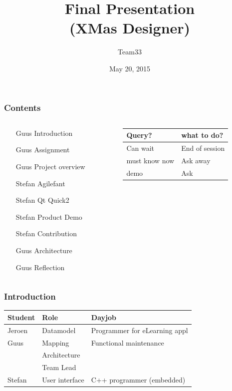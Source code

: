 \documentclass[11pt]{beamer}
\author{Team33}
\title{Final Presentation\\(XMas Designer)}
\institute{Open University/\\Guus Bonnema, Stefan Versluys, Jeroen Kleijn}
\date{May 20, 2015}
\begin{document}
\newcommand{\Noc}{\textsc{NoC}\xspace}
\newcommand{\qt}{\textsc{Qt}\xspace}
\newcommand{\qml}{\textsc{Qml}\xspace}
\newcommand{\ou}{\textsc{Ou}\xspace}
\newcommand{\dad}{\textsc{Dad}\xspace}

\begin{frame}
	\titlepage
\end{frame}

\begin{frame}
	\frametitle{Contents}
	\begin{columns}
		\begin{column}[t]{5cm}
			\begin{itemize}
				\item [Guus] Introduction 
				\item [Guus] Assignment
				\item [Guus] Project overview
				\item [Stefan] Agilefant
				\item [Stefan] Qt Quick2
				\item [Stefan] Product Demo
				\item [Stefan] Contribution
				\item [Guus] Architecture
				\item [Guus] Reflection
			\end{itemize}	
		\end{column}
		\begin{column}[t]{5cm}
			
			\begin{tabular}{ll}
				\hline
				{\tiny Query?} &  {\tiny what to do?} \\
				\hline
				{\tiny Can wait} & {\tiny End of session}\\
				{\tiny must know now} & {\tiny Ask away} \\
			 	{\tiny demo} & {\tiny Ask}\\
			 	\hline
			\end{tabular}
		\end{column}
	\end{columns}
	
\end{frame}

\begin{frame}
	\frametitle{Introduction}
	\begin{tabular}{lp{2.5cm}p{4cm}}
	\hline
	{\bf Student} & {\bf Role}      & {\bf Dayjob}\\\hline
	Jeroen        &  Datamodel      & Programmer for eLearning appl\\
	Guus	      &  Mapping        & Functional maintenance\\
	              &  Architecture   &                       \\
	              &  Team Lead     & \\
	Stefan        &  User interface & C++ programmer (embedded)\\
	\hline
	\end{tabular}
\end{frame}
\end{document}
